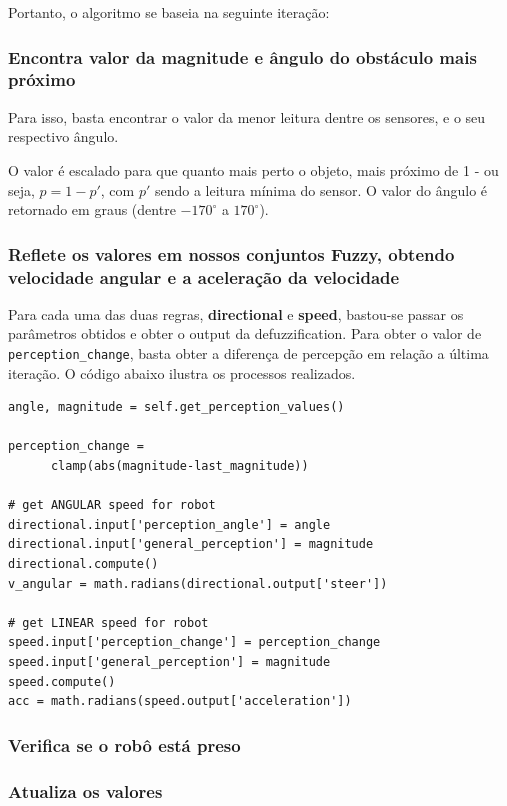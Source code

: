 \documentclass[twoside,conference,a4paper]{IEEEtran}
\begin{document}
Portanto, o algoritmo se baseia na seguinte iteração: \\

  \subsubsection{Encontra valor da magnitude e ângulo do obstáculo mais próximo}
    Para isso, basta encontrar o valor da menor leitura dentre os sensores, e o seu respectivo ângulo. 

    O valor é escalado para que quanto mais perto o objeto, mais próximo de 1 - ou seja, $p = 1-p'$, com $p'$ sendo a leitura mínima do sensor. O valor do ângulo é retornado em graus (dentre $-170^{\circ}$ a $170^{\circ}$). \\

  \subsubsection{Reflete os valores em nossos conjuntos Fuzzy, obtendo velocidade angular e a aceleração da velocidade}
    Para cada uma das duas regras, \textbf{directional} e \textbf{speed}, bastou-se passar os parâmetros obtidos e obter o output da defuzzification. Para obter o valor de \texttt{perception\_change}, basta obter a diferença de percepção em relação a última iteração. O código abaixo ilustra os processos realizados.

    \begin{lstlisting}[caption={Aplicação dos conjuntos fuzzy}]
angle, magnitude = self.get_perception_values()

perception_change = 
      clamp(abs(magnitude-last_magnitude))

# get ANGULAR speed for robot
directional.input['perception_angle'] = angle
directional.input['general_perception'] = magnitude
directional.compute()
v_angular = math.radians(directional.output['steer'])

# get LINEAR speed for robot
speed.input['perception_change'] = perception_change
speed.input['general_perception'] = magnitude
speed.compute()
acc = math.radians(speed.output['acceleration'])
    \end{lstlisting}

  \subsubsection{Verifica se o robô está preso}
  \subsubsection{Atualiza os valores}
\end{document}
